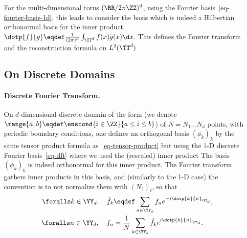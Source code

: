 For the multi-dimensional torus $(\RR/2\pi\ZZ)^d$, using the Fourier basis~\eqref{eq-fourier-basis-1d}, this leads to consider the basis
which is indeed a Hilbertian orthonormal basis for the inner product $\dotp{f}{g} \eqdef \frac{1}{(2\pi)^d} \int_{\TT^d} f(x)\bar g(x)\d x$. 
%
This defines the Fourier transform and the reconstruction formula on $L^2(\TT^d)$

\subsection{On Discrete Domains}
\label{sec-fft-2d}

\paragraph{Discrete Fourier Transform.}

On $d$-dimensional discrete domain of the form
(we denote $\range{a,b} \eqdef \enscond{i \in \ZZ}{a \leq i \leq b}$)
of $N=N_1\ldots N_d$ points, with periodic boundary conditions, one defines an orthogonal basis $(\phi_k)_k$ by the same tensor product formula as~\eqref{eq-tensor-product} but using the 1-D discrete Fourier basis~\eqref{eq-dft}
where we used the (rescaled) inner product
The basis $(\phi_k)_k$ is indeed orthonormal for this inner product. The Fourier transform gathers inner products in this basis, and (similarly to the 1-D case) the convention is to not normalize them with $(N_\ell)_\ell$, so that 
\begin{align*}
	\foralls k \in \YY_d, \quad 
	\hat f_k &\eqdef \sum_{n \in \YY_d} f_n e^{ -\imath \dotp{k}{n}_{\YY_d} }, \\
	\foralls n \in \YY_d, \quad 
	f_n &= \frac{1}{N} \sum_{k \in \YY_d} \hat f_k e^{ \imath \dotp{k}{n}_{\YY_d} }.
\end{align*}



